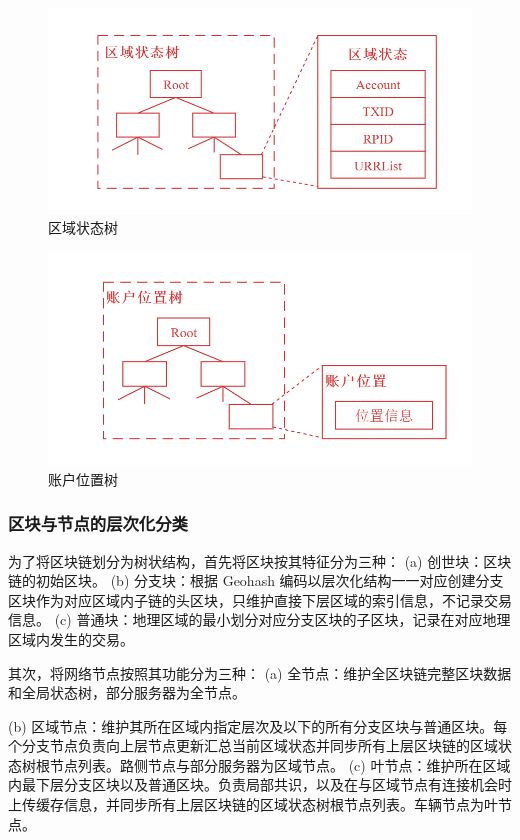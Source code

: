 \begin{figure}
  \centering
  \includegraphics[width=1.0\textwidth]{figures/区域状态树}
  \caption{区域状态树}\label{fig:regionState}
\end{figure}

\begin{figure}
  \centering
  \includegraphics[width=1.0\textwidth]{figures/账户位置树}
  \caption{账户位置树}\label{fig:accountLocation}
\end{figure}

\subsubsection{区块与节点的层次化分类}
为了将区块链划分为树状结构，首先将区块按其特征分为三种：
(a) 创世块：区块链的初始区块。
(b) 分支块：根据 Geohash 编码以层次化结构一一对应创建分支区块作为对应区域内子链的头区块，只维护直接下层区域的索引信息，不记录交易信息。
(c) 普通块：地理区域的最小划分对应分支区块的子区块，记录在对应地理区域内发生的交易。

其次，将网络节点按照其功能分为三种：
(a) 全节点：维护全区块链完整区块数据和全局状态树，部分服务器为全节点。

(b) 区域节点：维护其所在区域内指定层次及以下的所有分支区块与普通区块。每个分支节点负责向上层节点更新汇总当前区域状态并同步所有上层区块链的区域状态树根节点列表。路侧节点与部分服务器为区域节点。
(c) 叶节点：维护所在区域内最下层分支区块以及普通区块。负责局部共识，以及在与区域节点有连接机会时上传缓存信息，并同步所有上层区块链的区域状态树根节点列表。车辆节点为叶节点。
